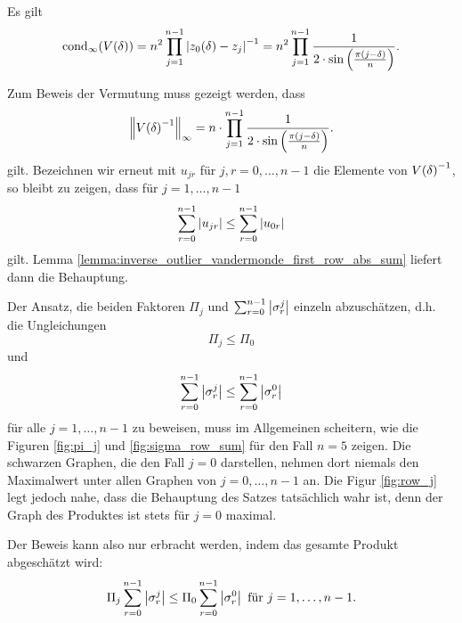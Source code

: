 \begin{assumption}
    Es gilt
    \begin{equation}
        \cond[\infty]{ \Vand{\delta} }
        = n^2 \prod_{j=1}^{n-1} \abs{ z_0(\delta) - z_j }^{-1}
        = n^2 \prod_{j=1}^{n-1} \frac{1}{2 \cdot \sin \left(\frac{\pi (j - \delta)}{n} \right)}.
    \end{equation}
\end{assumption}

\begin{remark}
    Zum Beweis der Vermutung muss gezeigt werden, dass
    \[
        \norm{\Vand{\delta}^{-1}}_\infty
        = n \cdot \prod_{j=1}^{n-1} \frac{1}{2 \cdot \sin \left(\frac{\pi (j - \delta)}{n} \right)}.
    \]
    gilt.
    Bezeichnen wir erneut mit $u_{jr}$ für $j,r = 0, \dots, n-1$ die Elemente von $\Vand{\delta}^{-1}$,
    so bleibt zu zeigen, dass für $j = 1, \dots, n-1$
    \[
        \sum_{r=0}^{n-1} \abs{u_{jr}} \leq \sum_{r=0}^{n-1} \abs{u_{0r}}
    \]
    gilt.
    Lemma \ref{lemma:inverse_outlier_vandermonde_first_row_abs_sum} liefert dann die Behauptung.

    \noindent Der Ansatz, die beiden Faktoren $\Pi_j$ und
    $\sum_{r=0}^{n-1} \abs{\sigma_r^j}$ einzeln abzuschätzen,
    d.h. die Ungleichungen
    \[
        \Pi_j \leq \Pi_0
    \]
    und
    \[
        \sum_{r=0}^{n-1} \abs{\sigma_r^j} \leq \sum_{r=0}^{n-1} \abs{\sigma_r^0}
    \]
    für alle $ j=1, \dots, n-1$ zu beweisen, muss im Allgemeinen scheitern, wie
    die Figuren \ref{fig:pi_j} und \ref{fig:sigma_row_sum} für den Fall $n=5$ zeigen.
    Die schwarzen Graphen, die den Fall $j=0$ darstellen, nehmen dort niemals
    den Maximalwert unter allen Graphen von $j=0, \dots, n-1$ an.
    Die Figur \ref{fig:row_j} legt jedoch nahe, dass die Behauptung des
    Satzes tatsächlich wahr ist, denn der Graph des Produktes ist stets für
    $j=0$ maximal.

    \noindent Der Beweis kann also nur erbracht werden, indem das gesamte Produkt
    abgeschätzt wird:
    \[
        \Pi_j \sum_{r=0}^{n-1} \abs{\sigma_r^j} \leq \Pi_0 \sum_{r=0}^{n-1} \abs{\sigma_r^0} \text{ für } j=1, \dots, n-1.
    \]
\end{remark}

%
%

